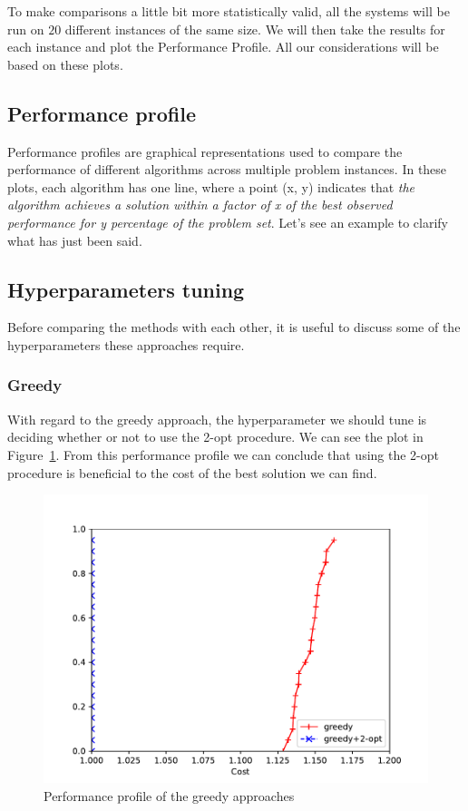 \documentclass{article}
\begin{document}
To make comparisons a little bit more statistically valid, all the systems will be run on
$20$ different instances of the same size. We will then take the results for each instance
and plot the Performance Profile. All our considerations will be based on these plots.

\subsection{Performance profile}
Performance profiles are graphical representations used to compare the performance of different algorithms
across multiple problem instances.
In these plots, each algorithm has one line, where a point (x, y) indicates that \textit{the algorithm achieves a solution within
a factor of x of the best observed performance for y percentage of the problem set}.
Let's see an example to clarify what has just been said.


\subsection{Hyperparameters tuning}
Before comparing the methods with each other, it is useful to discuss some
of the hyperparameters these approaches require.

\subsubsection{Greedy}
With regard to the greedy approach, the hyperparameter we should tune is
deciding whether or not to use the 2-opt procedure. We can see the plot
in Figure~\ref{fig:ht_greedy}. From this performance profile we can conclude
that using the 2-opt procedure is beneficial to the cost of the best
solution we can find.

\begin{figure}[ht]
        \caption{Performance profile of the greedy approaches}
        \label{fig:ht_greedy}
        \centering
        \includegraphics[width=340pt]{assets/ht_greedy.pdf}
\end{figure}
\end{document}
